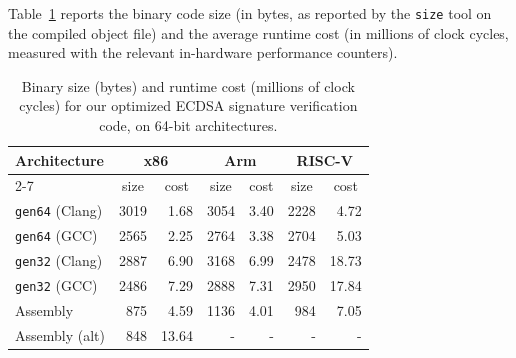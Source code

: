 \documentclass{llncs}
\begin{document}
Table~\ref{tab:perf} reports the binary code size (in bytes, as reported
by the \verb+size+ tool on the compiled object file) and the average
runtime cost (in millions of clock cycles, measured with the relevant
in-hardware performance counters).

\begin{table}
\begin{center}
{\renewcommand{\arraystretch}{1.1}%
\setlength{\tabcolsep}{1em}%
\begin{tabular}{|l|r|r|r|r|r|r|}
\hline
\textsf{\textbf{Architecture}}
& \multicolumn{2}{c|}{x86}
& \multicolumn{2}{c|}{Arm}
& \multicolumn{2}{c|}{RISC-V} \\
\cline{2-7}
& \multicolumn{1}{c|}{size} & \multicolumn{1}{c|}{cost}
& \multicolumn{1}{c|}{size} & \multicolumn{1}{c|}{cost}
& \multicolumn{1}{c|}{size} & \multicolumn{1}{c|}{cost} \\
\hline
\texttt{gen64} (Clang) & 3019 &  1.68 & 3054 & 3.40 & 2228 &  4.72 \\
\texttt{gen64} (GCC)   & 2565 &  2.25 & 2764 & 3.38 & 2704 &  5.03 \\
\texttt{gen32} (Clang) & 2887 &  6.90 & 3168 & 6.99 & 2478 & 18.73 \\
\texttt{gen32} (GCC)   & 2486 &  7.29 & 2888 & 7.31 & 2950 & 17.84 \\
Assembly               &  875 &  4.59 & 1136 & 4.01 &  984 &  7.05 \\
Assembly (alt)         &  848 & 13.64 &    - &    - &    - &     - \\
\hline
\end{tabular}}
\end{center}
\caption{\label{tab:perf}Binary size (bytes) and runtime cost (millions
of clock cycles) for our optimized ECDSA signature verification code,
on 64-bit architectures.}
\end{table}
\end{document}

